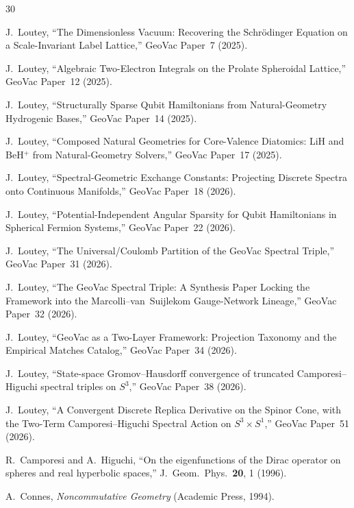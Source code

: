\documentclass[twocolumn,pra,amsmath,amssymb,superscriptaddress]{revtex4-2}
\begin{document}
\begin{thebibliography}{30}

 J.~Loutey, ``The Dimensionless Vacuum: Recovering the
  Schr\"odinger Equation on a Scale-Invariant Label Lattice,'' GeoVac Paper~7
  (2025).

 J.~Loutey, ``Algebraic Two-Electron Integrals on the
  Prolate Spheroidal Lattice,'' GeoVac Paper~12 (2025).

 J.~Loutey, ``Structurally Sparse Qubit
  Hamiltonians from Natural-Geometry Hydrogenic Bases,'' GeoVac Paper~14 (2025).

 J.~Loutey, ``Composed Natural Geometries for
  Core-Valence Diatomics: LiH and BeH$^+$ from Natural-Geometry Solvers,''
  GeoVac Paper~17 (2025).

 J.~Loutey, ``Spectral-Geometric Exchange
  Constants: Projecting Discrete Spectra onto Continuous Manifolds,''
  GeoVac Paper~18 (2026).

 J.~Loutey, ``Potential-Independent Angular Sparsity
  for Qubit Hamiltonians in Spherical Fermion Systems,'' GeoVac
  Paper~22 (2026).

 J.~Loutey, ``The Universal/Coulomb Partition of the
  GeoVac Spectral Triple,'' GeoVac Paper~31 (2026).

 J.~Loutey, ``The GeoVac Spectral Triple: A Synthesis
  Paper Locking the Framework into the Marcolli--van~Suijlekom
  Gauge-Network Lineage,'' GeoVac Paper~32 (2026).

 J.~Loutey, ``GeoVac as a Two-Layer Framework:
  Projection Taxonomy and the Empirical Matches Catalog,'' GeoVac Paper~34 (2026).

 J.~Loutey, ``State-space Gromov--Hausdorff convergence
  of truncated Camporesi--Higuchi spectral triples on $S^3$,''
  GeoVac Paper~38 (2026).

 J.~Loutey, ``A Convergent Discrete Replica Derivative on the
  Spinor Cone, with the Two-Term Camporesi--Higuchi Spectral Action on
  $S^3 \times S^1$,'' GeoVac Paper~51 (2026).

 R.~Camporesi and A.~Higuchi, ``On the
  eigenfunctions of the Dirac operator on spheres and real hyperbolic
  spaces,'' J.~Geom.\ Phys.\ \textbf{20}, 1 (1996).

 A.~Connes, \textit{Noncommutative Geometry}
  (Academic Press, 1994).


\end{thebibliography}
\end{document}
